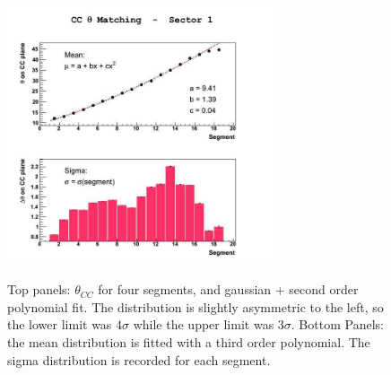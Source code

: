 \begin{figure}[h]
		\includegraphics[width=0.70\textwidth]{img/cc_theta_matching_pars_sect1.jpg}
 		\label{fig:ccm_slices}
		\caption{Top panels: $\theta_{CC}$ for four segments, and gaussian + second order
					polynomial fit. The distribution is slightly asymmetric to the
               left, so the lower limit was $4\sigma$ while the upper limit
               was $3\sigma$.
               Bottom Panels: the mean distribution is fitted with a third order
               polynomial. The sigma distribution is recorded for each segment. }
\end{figure}


